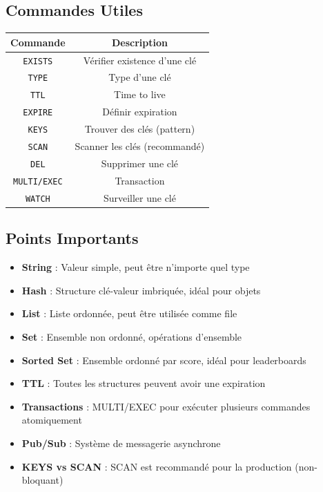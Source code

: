 \documentclass[11pt,a4paper]{article}
\begin{document}
\subsection{Commandes Utiles}

\begin{table}[h]
\centering
\begin{tabular}{|c|c|}
\hline
\textbf{Commande} & \textbf{Description} \\
\hline
\texttt{EXISTS} & Vérifier existence d'une clé \\
\hline
\texttt{TYPE} & Type d'une clé \\
\hline
\texttt{TTL} & Time to live \\
\hline
\texttt{EXPIRE} & Définir expiration \\
\hline
\texttt{KEYS} & Trouver des clés (pattern) \\
\hline
\texttt{SCAN} & Scanner les clés (recommandé) \\
\hline
\texttt{DEL} & Supprimer une clé \\
\hline
\texttt{MULTI/EXEC} & Transaction \\
\hline
\texttt{WATCH} & Surveiller une clé \\
\hline
\end{tabular}
\end{table}

\subsection{Points Importants}

\begin{itemize}
    \item \textbf{String} : Valeur simple, peut être n'importe quel type
    \item \textbf{Hash} : Structure clé-valeur imbriquée, idéal pour objets
    \item \textbf{List} : Liste ordonnée, peut être utilisée comme file
    \item \textbf{Set} : Ensemble non ordonné, opérations d'ensemble
    \item \textbf{Sorted Set} : Ensemble ordonné par score, idéal pour leaderboards
    \item \textbf{TTL} : Toutes les structures peuvent avoir une expiration
    \item \textbf{Transactions} : MULTI/EXEC pour exécuter plusieurs commandes atomiquement
    \item \textbf{Pub/Sub} : Système de messagerie asynchrone
    \item \textbf{KEYS vs SCAN} : SCAN est recommandé pour la production (non-bloquant)
\end{itemize}
\end{document}
